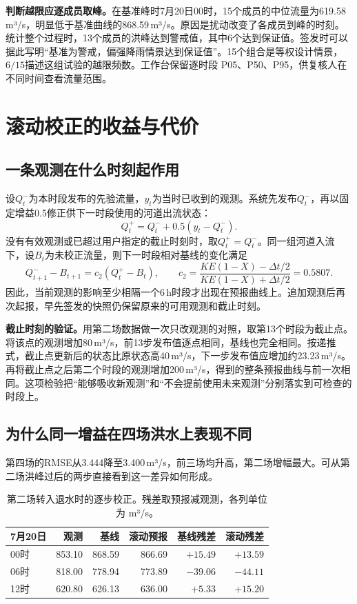 \textbf{判断越限应逐成员取峰。}在基准峰时7月20日00时，15个成员的中位流量为619.58\,m³/s，明显低于基准曲线的868.59\,m³/s。原因是扰动改变了各成员到峰的时刻。统计整个过程时，13个成员的洪峰达到警戒值，其中6个达到保证值。签发时可以据此写明“基准为警戒，偏强降雨情景达到保证值”。15个组合是等权设计情景，$6/15$描述这组试验的越限频数。工作台保留逐时段 P05、P50、P95，供复核人在不同时间查看流量范围。

\section{滚动校正的收益与代价}
\subsection{一条观测在什么时刻起作用}
设$Q_t^-$为本时段发布的先验流量，$y_t$为当时已收到的观测。系统先发布$Q_t^-$，再以固定增益0.5修正供下一时段使用的河道出流状态：
\[
Q_t^+=Q_t^-+0.5(y_t-Q_t^-).
\]
没有有效观测或已超过用户指定的截止时刻时，取$Q_t^+=Q_t^-$。同一组河道入流下，设$B_t$为未校正流量，则下一时段相对基线的变化满足
\[
 Q_{t+1}^--B_{t+1}=c_2(Q_t^+-B_t),\qquad
 c_2=\frac{KE(1-X)-\Delta t/2}{KE(1-X)+\Delta t/2}=0.5807 .
\]
因此，当前观测的影响至少相隔一个6\,h时段才出现在预报曲线上。追加观测后再次起报，早先签发的快照仍保留原来的可用观测和截止时刻。

\textbf{截止时刻的验证。}用第二场数据做一次只改观测的对照，取第13个时段为截止点。将该点的观测增加80\,m³/s，前13步发布值逐点相同，基线也完全相同。按递推式，截止点更新后的状态比原状态高40\,m³/s，下一步发布值应增加约23.23\,m³/s。再将截止点之后第二个时段的观测增加200\,m³/s，得到的整条预报曲线与前一次相同。这项检验把“能够吸收新观测”和“不会提前使用未来观测”分别落实到可检查的时段上。

\subsection{为什么同一增益在四场洪水上表现不同}
\begin{table}[H]\centering\small\caption{同一场资料在开关滚动校正时的比较。两组共用强迫、初始状态和参数，RMSE单位为 m³/s。}
\end{table}
第四场的RMSE从3.444降至3.400\,m³/s，前三场均升高，第二场增幅最大。可从第二场洪峰过后的两步直接看到这一差异如何形成。
\begin{table}[H]\centering\small\caption{第二场转入退水时的逐步校正。残差取预报减观测，各列单位为 m³/s。}
\begin{tabular}{lrrrrr}\toprule 7月20日 & 观测 & 基线 & 滚动预报 & 基线残差 & 滚动残差\\\midrule
00时 &853.10&868.59&866.69&$+15.49$&$+13.59$\\
06时 &818.00&778.94&773.89&$-39.06$&$-44.11$\\
12时 &620.80&626.13&636.00&$+5.33$&$+15.20$\\\bottomrule\end{tabular}\end{table}


